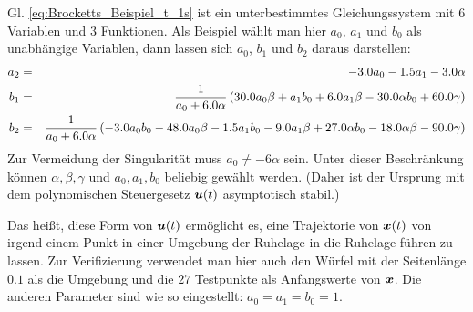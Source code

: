 Gl. \eqref{eq:Brocketts_Beispiel_t_1s} ist ein unterbestimmtes Gleichungssystem mit $6$ Variablen und $3$ Funktionen. Als Beispiel wählt man hier $a_{0}$, $a_{1}$ und $b_{0}$ als unabhängige Variablen, dann lassen sich $a_{0}$, $b_{1}$ und $b_{2}$ daraus darstellen:
\begin{eqnarray}
a_{2} &=& - 3.0 a_{0} - 1.5 a_{1} - 3.0 \alpha\notag\\
b_{1} &=& \frac{1}{a_{0} + 6.0 \alpha} \left(30.0 a_{0} \beta + a_{1} b_{0} + 6.0 a_{1} \beta - 30.0 \alpha b_{0} + 60.0 \gamma\right)\notag\\
b_{2} &=& \frac{1}{a_{0} + 6.0 \alpha} \left(- 3.0 a_{0} b_{0} - 48.0 a_{0} \beta - 1.5 a_{1} b_{0} - 9.0 a_{1} \beta + 27.0 \alpha b_{0} - 18.0 \alpha \beta - 90.0 \gamma\right)\notag\\
\label{eq:Brockett_e2_u(t)_polynom_a2_b1_b2}
\end{eqnarray}
Zur Vermeidung der Singularität muss $a_{0}\neq -6\alpha$ sein. Unter dieser Beschränkung können $\alpha,\beta,\gamma$ und $a_{0}, a_{1}, b_{0}$ beliebig gewählt werden. (Daher ist der Ursprung mit dem polynomischen Steuergesetz $\boldsymbol u(t)$ asymptotisch stabil.)

Das heißt, diese Form von $\boldsymbol u(t)$ ermöglicht es, eine Trajektorie von $\boldsymbol x(t)$ von irgend einem Punkt in einer Umgebung der Ruhelage in die Ruhelage führen zu lassen. Zur Verifizierung verwendet man hier auch den Würfel mit der Seitenlänge $0.1$ als die Umgebung und die $27$ Testpunkte als Anfangswerte von $\boldsymbol x$. Die anderen Parameter sind wie so eingestellt: $a_{0}=a_{1}=b_{0}=1$.

